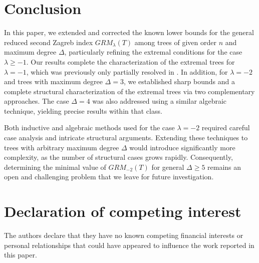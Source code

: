 \documentclass[preprint,12pt]{elsarticle}
\begin{document}
%
%

\vspace{0.5cm}



\section{Conclusion}

In this paper, we extended and corrected the known lower bounds for the general reduced second Zagreb index $GRM_\lambda(T)$ among trees of given order $n$ and maximum degree $\Delta$, particularly refining the extremal conditions for the case $\lambda \geq -1$. Our results complete the characterization of the extremal trees for $\lambda = -1$, which was previously only partially resolved in \cite{dehgardia2023}. In addition, for $\lambda = -2$ and trees with maximum degree $\Delta = 3$, we established sharp bounds and a complete structural characterization of the extremal trees via two complementary approaches. The case $\Delta = 4$ was also addressed using a similar algebraic technique, yielding precise results within that class.

Both inductive and algebraic methods used for the case $\lambda = -2$ required careful case analysis and intricate structural arguments. Extending these techniques to trees with arbitrary maximum degree $\Delta$ would introduce significantly more complexity, as the number of structural cases grows rapidly. Consequently, determining the minimal value of $GRM_{-2}(T)$ for general $\Delta \geq 5$ remains an open and challenging problem that we leave for future investigation.


\section*{Declaration of competing interest}

The authors declare that they have no known competing financial
interests or personal relationships that could have appeared to
influence the work reported in this paper.
\end{document}
